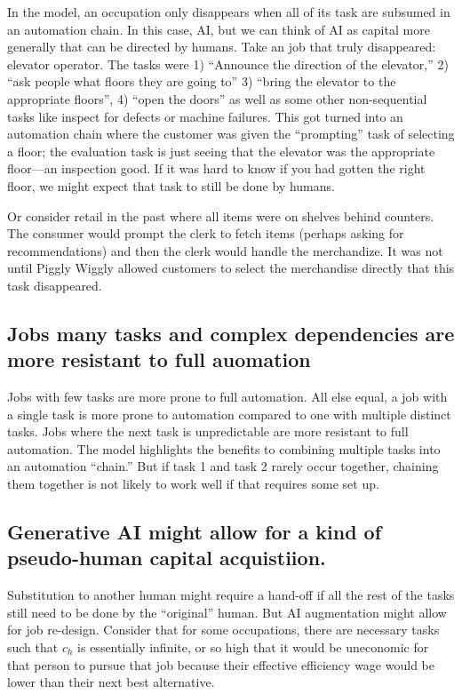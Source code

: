 \documentclass{article}
\begin{document}
In the model, an occupation only disappears when all of its task are subsumed in an automation chain.
In this case, AI, but we can think of AI as capital more generally that can be directed by humans. 
Take an job that truly disappeared: elevator operator. 
The tasks were 1) ``Announce the direction of the elevator,'' 2) ``ask people what floors they are going to'' 3) ``bring the elevator to the appropriate floors'', 4) ``open the doors'' as well as some other non-sequential tasks like inspect for defects or machine failures.  
This got turned into an automation chain where the customer was given the ``prompting'' task of selecting a floor; the evaluation task is just seeing that the elevator was the appropriate floor---an inspection good.
If it was hard to know if you had gotten the right floor, we might expect that task to still be done by humans.

Or consider retail in the past where all items were on shelves behind counters. 
The consumer would prompt the clerk to fetch items (perhaps asking for recommendations) and then the clerk would handle the merchandize. 
It was not until Piggly Wiggly allowed customers to select the merchandise directly that this task disappeared. 

\subsection{Jobs many tasks and complex dependencies are more resistant to full auomation}
Jobs with few tasks are more prone to full automation.
All else equal, a job with a single task is more prone to automation compared to one with multiple distinct tasks.
Jobs where the next task is unpredictable are more resistant to full automation.
The model highlights the benefits to combining multiple tasks into an automation ``chain.''
But if task 1 and task 2 rarely occur together, chaining them together is not likely to work well if that requires some set up.

\subsection{Generative AI might allow for a kind of pseudo-human capital acquistiion.}
Substitution to another human might require a hand-off if all the rest of the tasks still need to be done by the ``original'' human. 
But AI augmentation might allow for job re-design. 
Consider that for some occupations, there are necessary tasks such that $c_h$ is essentially infinite, or so high that it would be uneconomic for that person to pursue that job because their effective efficiency wage would be lower than their next best alternative.  
\end{document}
